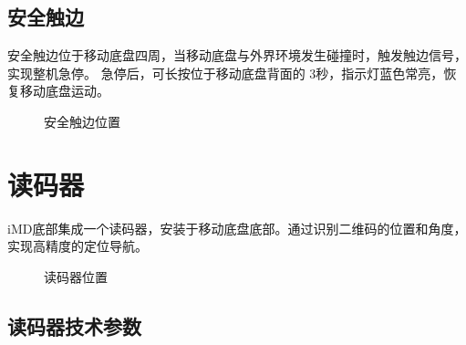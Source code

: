 \documentclass[a4paper,11pt,english,openany,oneside]{sphinxmanual}
\begin{document}
\subsection{安全触边}
\label{\detokenize{07 _u6280_u672f_u89c4_u683c:id32}}\label{\detokenize{07 _u6280_u672f_u89c4_u683c:id33}}
\sphinxAtStartPar
安全触边位于移动底盘四周，当移动底盘与外界环境发生碰撞时，触发触边信号，实现整机急停。
急停后，可长按位于移动底盘背面的  3秒，指示灯蓝色常亮，恢复移动底盘运动。

\begin{figure}[H]
\centering
\capstart

\noindent{}
\caption{安全触边位置}\label{\detokenize{07 _u6280_u672f_u89c4_u683c:id60}}\end{figure}


\section{读码器}
\label{\detokenize{07 _u6280_u672f_u89c4_u683c:id34}}\label{\detokenize{07 _u6280_u672f_u89c4_u683c:id35}}
\sphinxAtStartPar
iM\sphinxhyphen{}D底部集成一个读码器，安装于移动底盘底部。通过识别二维码的位置和角度，实现高精度的定位导航。

\begin{figure}[H]
\centering
\capstart

\noindent{}
\caption{读码器位置}\label{\detokenize{07 _u6280_u672f_u89c4_u683c:id61}}\end{figure}


\subsection{读码器技术参数}
\label{\detokenize{07 _u6280_u672f_u89c4_u683c:id36}}\label{\detokenize{07 _u6280_u672f_u89c4_u683c:id37}}
\end{document}
